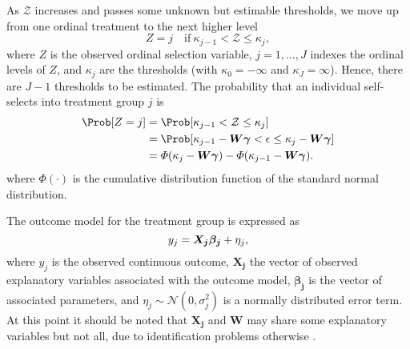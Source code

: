 \documentclass[%
    twoside, openright, titlepage, numbers=noenddot,%
    cleardoublepage=empty,%
    abstract=false,%
    BCOR=5.5mm, paper=a5, fontsize=10pt,%
]{scrreprt}
\begin{document}
As $\mathcal{Z}$ increases and passes some unknown but estimable thresholds, we move up from one ordinal treatment to the next higher level
%
\begin{equation} \label{eq:thresholds}
Z = j \quad \mathrm{if}\ \kappa_{j-1} < \mathcal{Z} \le \kappa_j,
\end{equation}
%
where $Z$ is the observed ordinal selection variable, $j = 1, \dots, J$ indexes the ordinal levels of $Z$, and $\kappa_j$ are the thresholds (with $\kappa_0 = -\infty$ and $\kappa_J = \infty$). Hence, there are $J-1$ thresholds to be estimated. The probability that an individual self-selects into treatment group $j$ is
%
\begin{equation} \label{eq:prob-selection}
\begin{aligned}
\Prob[Z = j] &= \Prob[\kappa_{j-1} < \mathcal{Z} \le \kappa_j] \\
&= \Prob[\kappa_{j-1} - \Wg < \epsilon \le \kappa_j - \Wg] \\
&= \Phi(\kappa_j - \Wg) - \Phi(\kappa_{j-1} - \Wg).
\end{aligned}
\end{equation}
%
where $\Phi(\cdot)$ is the cumulative distribution function of the standard normal distribution.

The outcome model for the \jth treatment group is expressed as
%
\begin{equation} \label{eq:outcome}
y_j = \boldsymbol{X_j}\boldsymbol{\beta_j} + \eta_j,
\end{equation}
%
where $y_j$ is the observed continuous outcome, $\boldsymbol{X_j}$ the vector of observed explanatory variables associated with the \jth outcome model, $\boldsymbol{\beta_j}$ is the vector of associated parameters, and $\eta_j \sim \mathcal{N}(0, \sigma_j^2)$ is a normally distributed error term. At this point it should be noted that $\boldsymbol{X_j}$ and $\boldsymbol{W}$ may share some explanatory variables but not all, due to identification problems otherwise \citep{Chiburis+Lokshin:2007}.
\end{document}
